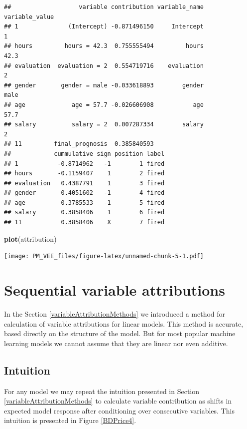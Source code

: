 \documentclass[]{krantz}
\newenvironment{Shaded}{\begin{snugshade}}{\end{snugshade}}
\newcommand{\KeywordTok}[1]{\textcolor[rgb]{0.13,0.29,0.53}{\textbf{#1}}}
\newcommand{\NormalTok}[1]{#1}
\theoremstyle{definition}
\theoremstyle{definition}
\theoremstyle{definition}
\theoremstyle{remark}
\begin{document}
\begin{verbatim}
##                   variable contribution variable_name variable_value
## 1              (Intercept) -0.871496150     Intercept              1
## hours         hours = 42.3  0.755555494         hours           42.3
## evaluation  evaluation = 2  0.554719716    evaluation              2
## gender       gender = male -0.033618893        gender           male
## age             age = 57.7 -0.026606908           age           57.7
## salary          salary = 2  0.007287334        salary              2
## 11         final_prognosis  0.385840593                             
##            cummulative sign position label
## 1           -0.8714962   -1        1 fired
## hours       -0.1159407    1        2 fired
## evaluation   0.4387791    1        3 fired
## gender       0.4051602   -1        4 fired
## age          0.3785533   -1        5 fired
## salary       0.3858406    1        6 fired
## 11           0.3858406    X        7 fired
\end{verbatim}

\begin{Shaded}
\begin{Highlighting}[]
\KeywordTok{plot}\NormalTok{(attribution)}
\end{Highlighting}
\end{Shaded}

\texttt{[image: PM\_VEE\_files/figure-latex/unnamed-chunk-5-1.pdf]}

\hypertarget{breakDown}{%
\section{Sequential variable attributions}\label{breakDown}}

In the Section \ref{variableAttributionMethods} we introduced a method
for calculation of variable attributions for linear models. This method
is accurate, based directly on the structure of the model. But for most
popular machine learning models we cannot assume that they are linear
nor even additive.

\hypertarget{intuition-1}{%
\subsection{Intuition}\label{intuition-1}}

For any model we may repeat the intuition presented in Section
\ref{variableAttributionMethods} to calculate variable contribution as
shifts in expected model response after conditioning over consecutive
variables. This intuition is presented in Figure \ref{BDPrice4}.
\end{document}
